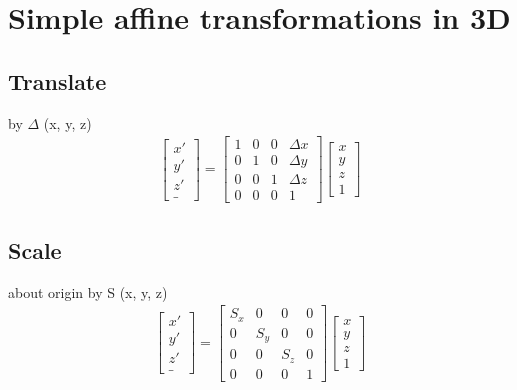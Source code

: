 \documentclass{article}
\begin{document}
\section{Simple affine transformations in 3D}

\subsection{Translate}
by $\Delta$ (x, y, z)
\begin{gather}
	\begin{bmatrix}
		x'\\
		y'\\
		z'\\
		\_
	\end{bmatrix}
	=
	\begin{bmatrix}
		1 & 0 & 0 & \Delta x\\
		0 & 1 & 0 & \Delta y\\
		0 & 0 & 1 & \Delta z\\
		0 & 0 & 0 & 1
	\end{bmatrix}
	\begin{bmatrix}
		x\\
		y\\
		z\\
		1
	\end{bmatrix}
\end{gather}

\subsection{Scale}
about origin
by S (x, y, z)
\begin{gather}
	\begin{bmatrix}
		x'\\
		y'\\
		z'\\
		\_
	\end{bmatrix}
	=
	\begin{bmatrix}
		S_x & 0   & 0   & 0\\
		0   & S_y & 0   & 0\\
		0   & 0   & S_z & 0\\
		0   & 0   & 0   & 1
	\end{bmatrix}
	\begin{bmatrix}
		x\\
		y\\
		z\\
		1
	\end{bmatrix}
\end{gather}
\end{document}
